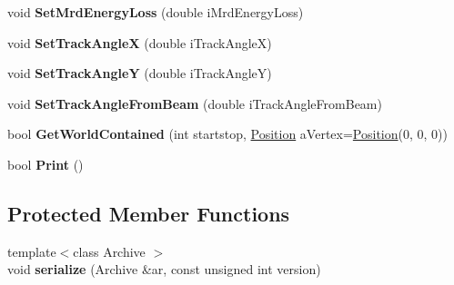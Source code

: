 \begin{DoxyCompactItemize}
\item 
\hypertarget{classMCParticle_a3db0d00c918e435c4cacc51e80fad7db}{void {\bfseries Set\-Mrd\-Energy\-Loss} (double i\-Mrd\-Energy\-Loss)}\label{classMCParticle_a3db0d00c918e435c4cacc51e80fad7db}

\item 
\hypertarget{classMCParticle_abc9a006d2fb4c95ca7f08fa218867c21}{void {\bfseries Set\-Track\-Angle\-X} (double i\-Track\-Angle\-X)}\label{classMCParticle_abc9a006d2fb4c95ca7f08fa218867c21}

\item 
\hypertarget{classMCParticle_af39b59b0cde215f2a6fe2183d8c580b9}{void {\bfseries Set\-Track\-Angle\-Y} (double i\-Track\-Angle\-Y)}\label{classMCParticle_af39b59b0cde215f2a6fe2183d8c580b9}

\item 
\hypertarget{classMCParticle_af278f6d766d7a4cc4818ae0b3e64f73f}{void {\bfseries Set\-Track\-Angle\-From\-Beam} (double i\-Track\-Angle\-From\-Beam)}\label{classMCParticle_af278f6d766d7a4cc4818ae0b3e64f73f}

\item 
\hypertarget{classMCParticle_a1691c5d5d847e0a2419cdad793ff2ddb}{bool {\bfseries Get\-World\-Contained} (int startstop, \hyperlink{classPosition}{Position} a\-Vertex=\hyperlink{classPosition}{Position}(0, 0, 0))}\label{classMCParticle_a1691c5d5d847e0a2419cdad793ff2ddb}

\item 
\hypertarget{classMCParticle_a602114887228de2afbfcd0a31ddba66c}{bool {\bfseries Print} ()}\label{classMCParticle_a602114887228de2afbfcd0a31ddba66c}

\end{DoxyCompactItemize}
\subsection*{Protected Member Functions}
\begin{DoxyCompactItemize}
\item 
\hypertarget{classMCParticle_ac28878d706363533ac74f18faf272fb4}{{\footnotesize template$<$class Archive $>$ }\\void {\bfseries serialize} (Archive \&ar, const unsigned int version)}\label{classMCParticle_ac28878d706363533ac74f18faf272fb4}

\end{DoxyCompactItemize}
